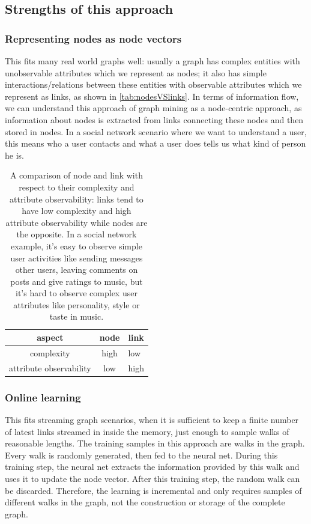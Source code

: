 \documentclass{article}
\begin{document}
\subsection{Strengths of this approach}

\subsubsection{Representing nodes as node vectors}
This fits many real world graphs well: usually a graph has complex entities with unobservable attributes which we represent as nodes; it also has simple interactions/relations between these entities with observable attributes which we represent as links, as shown in \autoref{tab:nodesVSlinks}. In terms of information flow, we can understand this approach of graph mining as a node-centric approach, as information about nodes is extracted from links connecting these nodes and then stored in nodes. In a social network scenario where we want to understand a user, this means who a user contacts and what a user does tells us what kind of person he is.
\begin{table}[h]
	\centering
	\begin{tabularx}{0.5\textwidth}{ |c|c|X| } \hline
		aspect  & node & link \\ \hline
		complexity & high & low \\ \hline
		attribute observability & low & high \\ \hline
	\end{tabularx}
	\caption{A comparison of node and link with respect to their complexity and attribute observability: links tend to have low complexity and high attribute observability while nodes are the opposite. In a social network example, it's easy to observe simple user activities like sending messages other users, leaving comments on posts and give ratings to music, but it's hard to observe complex user attributes like personality, style or taste in music.}
	\label{tab:nodesVSlinks}
\end{table}

\subsubsection{Online learning}
This fits streaming graph scenarios, when it is sufficient to keep a finite number of latest links streamed in inside the memory, just enough to sample walks of reasonable lengths. The training samples in this approach are walks in the graph. Every walk is randomly generated, then fed to the neural net. During this training step, the neural net extracts the information provided by this walk and uses it to update the node vector. After this training step,  the random walk can be discarded. Therefore, the learning is incremental and only requires samples of different walks in the graph, not the construction or storage of the complete graph.
\end{document}
